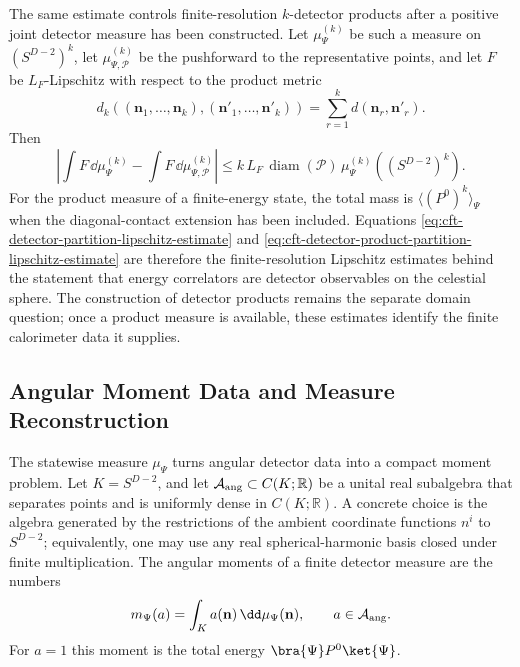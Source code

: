 The same estimate controls finite-resolution \(k\)-detector products after a
positive joint detector measure has been constructed.  Let
\(\mu_\Psi^{(k)}\) be such a measure on \((S^{D-2})^k\), let
\(\mu_{\Psi,\mathcal P}^{(k)}\) be the pushforward to the representative
points, and let \(F\) be \(L_F\)-Lipschitz with respect to the product metric
\[
  d_k((\mathbf n_1,\ldots,\mathbf n_k),
      (\mathbf n'_1,\ldots,\mathbf n'_k))
  =
  \sum_{r=1}^{k}d(\mathbf n_r,\mathbf n'_r).
\]
Then
\begin{equation}
  \left|
  \int F\,\dd\mu_\Psi^{(k)}
  -
  \int F\,\dd\mu_{\Psi,\mathcal P}^{(k)}
  \right|
  \leq
  k\,L_F\,\operatorname{diam}(\mathcal P)\,
  \mu_\Psi^{(k)}((S^{D-2})^k).
  \label{eq:cft-detector-product-partition-lipschitz-estimate}
\end{equation}
For the product measure of a finite-energy state, the total mass is
\(\langle(P^0)^k\rangle_\Psi\) when the diagonal-contact extension has been
included.  Equations
\eqref{eq:cft-detector-partition-lipschitz-estimate} and
\eqref{eq:cft-detector-product-partition-lipschitz-estimate} are therefore
the finite-resolution Lipschitz estimates behind the statement that energy
correlators are detector observables on the celestial sphere.  The
construction of detector products remains the separate domain question; once a
product measure is available, these estimates identify the finite calorimeter
data it supplies.

\subsection{Angular Moment Data and Measure Reconstruction}
\label{subsec:cft-detector-moment-reconstruction}

The statewise measure \(\mu_\Psi\) turns angular detector data into a compact
moment problem.  Let \(K=S^{D-2}\), and let
\(\mathcal A_{\rm ang}\subset C(K;\mathbb R)\) be a unital real subalgebra
that separates points and is uniformly dense in \(C(K;\mathbb R)\).  A
concrete choice is the algebra generated by the restrictions of the ambient
coordinate functions \(n^i\) to \(S^{D-2}\); equivalently, one may use any
real spherical-harmonic basis closed under finite multiplication.  The
angular moments of a finite detector measure are the numbers
\begin{equation}
  m_\Psi(a)
  =
  \int_K a(\mathbf n)\,\dd\mu_\Psi(\mathbf n),
  \qquad a\in\mathcal A_{\rm ang}.
  \label{eq:cft-detector-angular-moments}
\end{equation}
For \(a=1\) this moment is the total energy
\(\bra{\Psi}P^0\ket{\Psi}\).


